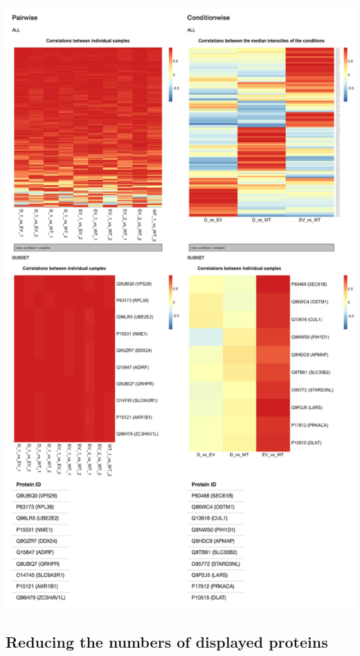 \documentclass[letterpaper, twocolumn, 9pt]{article}
\begin{document}
\includegraphics[width=\columnwidth]{figures/ss_correlations_hm.png}

\subsection{Reducing the numbers of displayed proteins}
\end{document}
